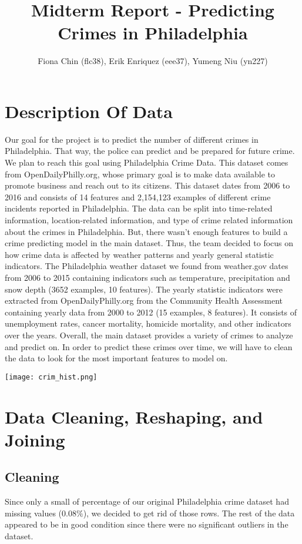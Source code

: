 \documentclass{article}
\title{Midterm Report - Predicting Crimes in Philadelphia }
\author{Fiona Chin (flc38), Erik Enriquez (eee37), Yumeng Niu (yn227)}
\begin{document}
\maketitle

\section*{Description Of Data}
Our goal for the project is to predict the number of different crimes in Philadelphia.  That way, the police can predict and be prepared for future crime. We plan to reach this goal using Philadelphia Crime Data.  This dataset comes from OpenDailyPhilly.org, whose primary goal is to make data available to promote business and reach out to its citizens.  This dataset dates from 2006 to 2016 and consists of 14 features and 2,154,123 examples of different crime incidents reported in Philadelphia.  The data can be split into time-related information, location-related information, and type of crime related information about the crimes in Philadelphia.  But, there wasn’t enough features to build a crime predicting model in the main dataset.  Thus, the team decided to focus on how crime data is affected by weather patterns and yearly general statistic indicators.  The Philadelphia weather dataset we found from weather.gov dates from 2006 to 2015 containing indicators such as temperature, precipitation and snow depth (3652 examples, 10 features).  The yearly statistic indicators were extracted from OpenDailyPhilly.org from the Community Health Assessment containing yearly data from 2000 to 2012 (15 examples, 8 features).  It consists of unemployment rates, cancer mortality, homicide mortality, and other indicators over the years.  Overall, the main dataset provides a variety of crimes to analyze and predict on.  In order to predict these crimes over time, we will have to clean the data to look for the most important features to model on.

\centerline{\texttt{[image: crim\_hist.png]}}

\section*{Data Cleaning, Reshaping, and Joining}
\subsection*{Cleaning}
Since only a small of percentage of our original Philadelphia crime dataset had missing values (0.08$\%$), we decided to get rid of those rows.  The rest of the data appeared to be in good condition since there were no significant outliers in the dataset.
\end{document}
